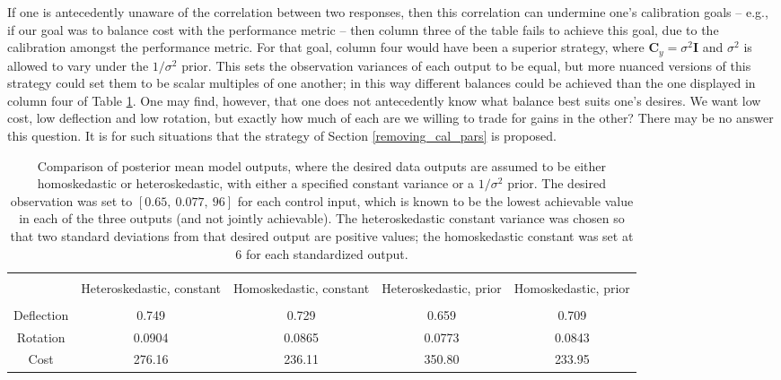 \documentclass{article}
\begin{document}
If one is antecedently unaware of the correlation between two responses, then this correlation can undermine one's calibration goals -- e.g., if our goal was to balance cost with the performance metric -- then column three of the table fails to achieve this goal, due to the calibration amongst the performance metric. For that goal, column four would have been a superior strategy, where $\mathbf C_y = \sigma^2 \mathbf I$ and $\sigma^2$ is allowed to vary under the $1/\sigma^2$ prior. This sets the observation variances of each output to be equal, but more nuanced versions of this strategy could set them to be scalar multiples of one another; in this way different balances could be achieved than the one displayed in column four of Table \ref{table:obs_var_comp}. One may find, however, that one does not antecedently know what balance best suits one's desires. We want low cost, low deflection and low rotation, but exactly how much of each are we willing to trade for gains in the other? There may be no answer this question. It is for such situations that the strategy of Section \ref{removing_cal_pars} is proposed.

\begin{table}[h]
\centering
\begin{tabular}{| c | c  |  c  | c |  c  |}
\hline
 \vspace{-3mm}
& & & & \\
& \parbox{24mm}{\centering Heteroskedastic, constant}& \parbox{24mm}{\centering Homoskedastic, constant}& \parbox{24mm}{\centering Heteroskedastic, prior} & \parbox{24mm}{\centering Homoskedastic, prior}\\
 \vspace{-3.5mm}
& & & & \\
\hline
Deflection & 0.749 & 0.729 & 0.659 & 0.709\\
Rotation & 0.0904 & 0.0865 & 0.0773 & 0.0843\\
Cost & 276.16 & 236.11 & 350.80 & 233.95 \\
\hline
\end{tabular}
\captionsetup{width=.8\linewidth}
\caption{Comparison of posterior mean model outputs, where the desired data outputs are assumed to be either homoskedastic or heteroskedastic, with either a specified constant variance or a $1/\sigma^2$ prior. The desired observation was set to $[0.65,\ 0.077,\ 96]$ for each control input, which is known to be the lowest achievable value in each of the three outputs (and not jointly achievable). The heteroskedastic constant variance was chosen so that two standard deviations from that desired output are positive values; the homoskedastic constant was set at 6 for each standardized output.}
\label{table:obs_var_comp}
\end{table}
\end{document}
